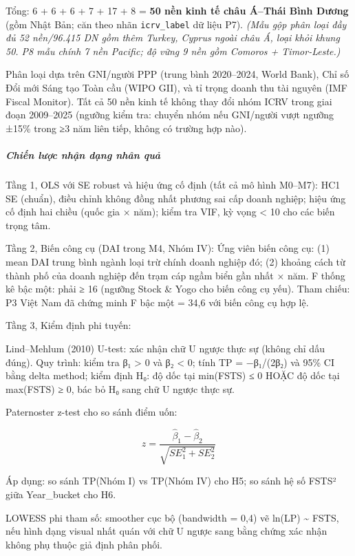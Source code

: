 \documentclass[
  a4paper,
  13pt]{extreport}
\begin{document}
Tổng: 6 + 6 + 6 + 7 + 17 + 8 = \textbf{50 nền kinh tế châu Á--Thái Bình
Dương} (gồm Nhật Bản; căn theo nhãn \texttt{icrv\_label} dữ liệu P7).
\emph{(Mẫu gộp phân loại đầy đủ 52 nền/96.415 DN gồm thêm Turkey, Cyprus
ngoài châu Á, loại khỏi khung 50. P8 mẫu chính 7 nền Pacific; độ vững 9
nền gồm Comoros + Timor-Leste.)}

Phân loại dựa trên GNI/người PPP (trung bình 2020--2024, World Bank),
Chỉ số Đổi mới Sáng tạo Toàn cầu (WIPO GII), và tỉ trọng doanh thu tài
nguyên (IMF Fiscal Monitor). Tất cả 50 nền kinh tế không thay đổi nhóm
ICRV trong giai đoạn 2009--2025 (ngưỡng kiểm tra: chuyển nhóm nếu
GNI/người vượt ngưỡng ±15\% trong ≥3 năm liên tiếp, không có trường hợp
nào).

\hypertarget{chiux1ebfn-lux1b0ux1ee3c-nhux1eadn-dux1ea1ng-nhuxe2n-quux1ea3}{%
\subparagraph{Chiến lược nhận dạng nhân
quả}\label{chiux1ebfn-lux1b0ux1ee3c-nhux1eadn-dux1ea1ng-nhuxe2n-quux1ea3}}

Tầng 1, OLS với SE robust và hiệu ứng cố định (tất cả mô hình M0--M7):
HC1 SE (chuẩn), điều chỉnh không đồng nhất phương sai cấp doanh nghiệp;
hiệu ứng cố định hai chiều (quốc gia × năm); kiểm tra VIF, kỳ vọng
\textless{} 10 cho các biến trọng tâm.

Tầng 2, Biến công cụ (DAI trong M4, Nhóm IV): Ứng viên biến công cụ: (1)
mean DAI trung bình ngành loại trừ chính doanh nghiệp đó; (2) khoảng
cách từ thành phố của doanh nghiệp đến trạm cáp ngầm biển gần nhất ×
năm. F thống kê bậc một: phải ≥ 16 (ngưỡng Stock \& Yogo cho biến công
cụ yếu). Tham chiếu: P3 Việt Nam đã chứng minh F bậc một = 34,6 với biến
công cụ hợp lệ.

Tầng 3, Kiểm định phi tuyến:

Lind--Mehlum (2010) U-test: xác nhận chữ U ngược thực sự (không chỉ dấu
đúng). Quy trình: kiểm tra β₁ \textgreater{} 0 và β₂ \textless{} 0; tính
TP = −β₁/(2β₂) và 95\% CI bằng delta method; kiểm định H₀: độ dốc tại
min(FSTS) ≤ 0 HOẶC độ dốc tại max(FSTS) ≥ 0, bác bỏ H₀ sang chữ U ngược
thực sự.

Paternoster z-test cho so sánh điểm uốn:

\[z = \frac{\hat{\beta}_1 - \hat{\beta}_2}{\sqrt{SE_1^2 + SE_2^2}}\]

Áp dụng: so sánh TP(Nhóm I) vs TP(Nhóm IV) cho H5; so sánh hệ số FSTS²
giữa Year\_bucket cho H6.

LOWESS phi tham số: smoother cục bộ (bandwidth = 0,4) vẽ ln(LP)
\textasciitilde{} FSTS, nếu hình dạng visual nhất quán với chữ U ngược
sang bằng chứng xác nhận không phụ thuộc giả định phân phối.
\end{document}
